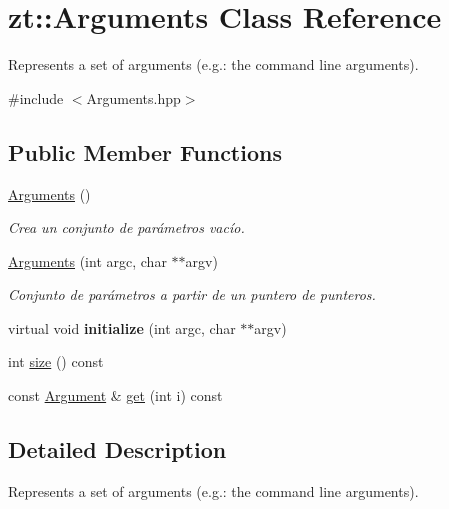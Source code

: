 \hypertarget{classzt_1_1_arguments}{}\section{zt\+:\+:Arguments Class Reference}
\label{classzt_1_1_arguments}


Represents a set of arguments (e.\+g.\+: the command line arguments).  




{\ttfamily \#include $<$Arguments.\+hpp$>$}

\subsection*{Public Member Functions}
\begin{DoxyCompactItemize}
\item 
\mbox{\label{classzt_1_1_arguments_a54f00e2e61fa29ba5c371bb858b572aa}} 
\hyperlink{classzt_1_1_arguments_a54f00e2e61fa29ba5c371bb858b572aa}{Arguments} ()
\begin{DoxyCompactList}\small\item\em Crea un conjunto de parámetros vacío. \end{DoxyCompactList}\item 
\hyperlink{classzt_1_1_arguments_a808eb391686c72c4196f4cf59610f427}{Arguments} (int argc, char $\ast$$\ast$argv)
\begin{DoxyCompactList}\small\item\em Conjunto de parámetros a partir de un puntero de punteros. \end{DoxyCompactList}\item 
\mbox{\label{classzt_1_1_arguments_a82a314122a0b4944d824fb73bd6242a0}} 
virtual void {\bfseries initialize} (int argc, char $\ast$$\ast$argv)
\item 
int \hyperlink{classzt_1_1_arguments_aee2e1c74257bd3a11d34edb1898341dc}{size} () const
\item 
const \hyperlink{classzt_1_1_argument}{Argument} \& \hyperlink{classzt_1_1_arguments_a0b71f588f3af4e114149773af8f31c2e}{get} (int i) const
\end{DoxyCompactItemize}


\subsection{Detailed Description}
Represents a set of arguments (e.\+g.\+: the command line arguments). 

